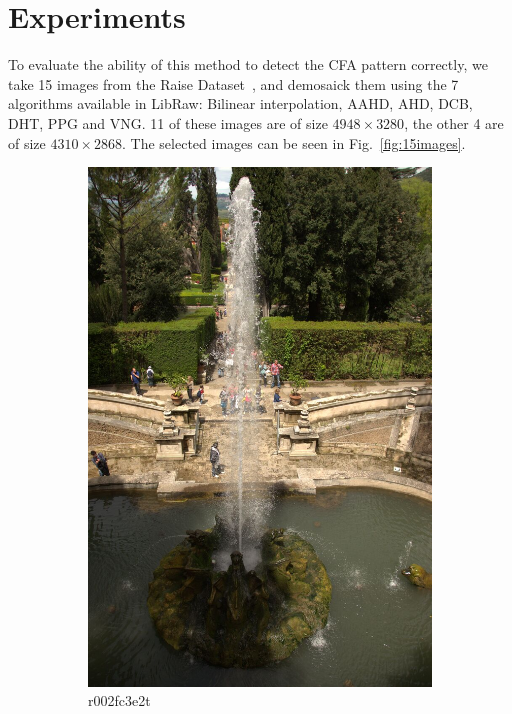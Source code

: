 \documentclass{ipol}
\begin{document}
\section{Experiments}
To evaluate the ability of this method to detect the CFA pattern correctly, we take 15 images from the Raise Dataset~\cite{raise}, and demosaick them using the 7 algorithms available in LibRaw: Bilinear interpolation, AAHD, AHD, DCB, DHT, PPG and VNG. 11 of these images are of size $4948\times3280$, the other 4 are of size $4310\times2868$. The selected images can be seen in Fig.~\ref{fig:15images}.

\begin{figure}[ht]
    \centering
    \begin{subfigure}[c]{.31\linewidth}\centering
    \includegraphics[height=\linewidth]{images/original/r002fc3e2t.jpeg}
    \caption{r002fc3e2t}
    \end{subfigure}\hfill%
    \begin{subfigure}[c]{.31\linewidth}\centering

\end{subfigure}
\end{figure}
\end{document}
